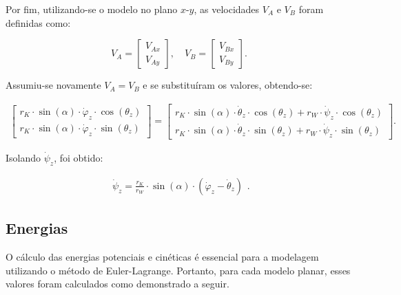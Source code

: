Por fim, utilizando-se o modelo no plano $x$-$y$, as velocidades \( V_A \) e \( V_B \) foram definidas como:

\begin{equation*}
    V_A = 
    \begin{bmatrix}
    V_{Ax} \\
    V_{Ay}
    \end{bmatrix}, \quad 
    V_B = 
    \begin{bmatrix}
    V_{Bx} \\
    V_{By}
    \end{bmatrix}.
\end{equation*}

Assumiu-se novamente \( V_A = V_B \) e se substituíram os valores, obtendo-se:

\begin{equation*}
    \begin{aligned}
        \begin{bmatrix}
        r_K \cdot \sin(\alpha) \cdot \dot \varphi_z \cdot \cos(\theta_z) \\
        r_K \cdot \sin(\alpha) \cdot \dot \varphi_z \cdot \sin(\theta_z)
        \end{bmatrix}=
        \begin{bmatrix}
        r_K \cdot \sin(\alpha) \cdot \dot \theta_z \cdot \cos(\theta_z) + r_W \cdot \dot \psi_z \cdot \cos(\theta_z)\\
        r_K \cdot \sin(\alpha) \cdot \dot \theta_z \cdot \sin(\theta_z) + r_W \cdot \dot \psi_z \cdot \sin(\theta_z)
        \end{bmatrix}.
    \end{aligned}
\end{equation*}

Isolando \( \dot{\psi}_z \), foi obtido:

\begin{equation}
    \label{eq:16}
    \begin{aligned}
        \dot \psi_z = \frac{r_K}{r_W} \cdot \sin(\alpha) \cdot (\dot \varphi_z - \dot \theta_z)
    \end{aligned}.
\end{equation}

\subsection{Energias}

O cálculo das energias potenciais e cinéticas é essencial para a modelagem utilizando o método de Euler-Lagrange. Portanto, para cada modelo planar, esses valores foram calculados como demonstrado a seguir.

